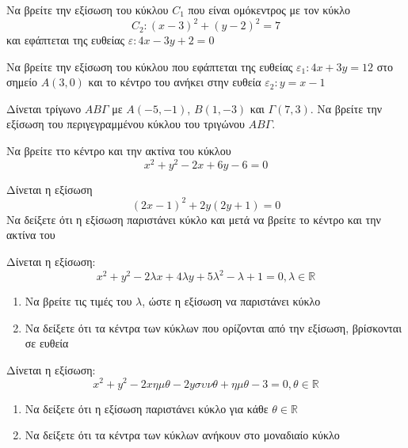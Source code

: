 \documentclass{presentation}
\begin{document}
\begin{askisi}
  Να βρείτε την εξίσωση του κύκλου $C_1$ που είναι ομόκεντρος με τον κύκλο
  $$C_2:(x-3)^2+(y-2)^2=7$$
  και εφάπτεται της ευθείας $ε:4x-3y+2=0$

\end{askisi}

\begin{askisi}
  Να βρείτε την εξίσωση του κύκλου που εφάπτεται της ευθείας $ε_1:4x+3y=12$ στο σημείο $Α(3,0)$ και το κέντρο του ανήκει στην ευθεία $ε_2:y=x-1$

\end{askisi}

\begin{askisi}
  Δίνεται τρίγωνο $ΑΒΓ$ με $Α(-5,-1)$, $Β(1,-3)$ και $Γ(7,3)$. Να βρείτε την εξίσωση του περιγεγραμμένου κύκλου του τριγώνου $ΑΒΓ$.

\end{askisi}

\begin{askisi}
  Να βρείτε ττο κέντρο και την ακτίνα του κύκλου
  $$x^2+y^2-2x+6y-6=0$$

\end{askisi}

\begin{askisi}
  Δίνεται η εξίσωση
  $$(2x-1)^2+2y(2y+1)=0$$
  Να δείξετε ότι η εξίσωση παριστάνει κύκλο και μετά να βρείτε το κέντρο και την ακτίνα του

\end{askisi}

\begin{askisi}
  Δίνεται η εξίσωση:
  $$x^2+y^2-2λx+4λy+5λ^2-λ+1=0,λ\in\mathbb{R}$$
  \begin{enumerate}
    \item<1-> Να βρείτε τις τιμές του $λ$, ώστε η εξίσωση να παριστάνει κύκλο
    \item<2-> Να δείξετε ότι τα κέντρα των κύκλων που ορίζονται από την εξίσωση, βρίσκονται σε ευθεία
  \end{enumerate}

\end{askisi}

\begin{askisi}
  Δίνεται η εξίσωση:
  $$x^2+y^2-2xημθ-2yσυνθ+ημθ-3=0,θ\in\mathbb{R}$$
  \begin{enumerate}
    \item<1-> Να δείξετε ότι η εξίσωση παριστάνει κύκλο για κάθε $θ\in\mathbb{R}$
    \item<2-> Να δείξετε ότι τα κέντρα των κύκλων ανήκουν στο μοναδιαίο κύκλο
  \end{enumerate}

\end{askisi}
\end{document}
